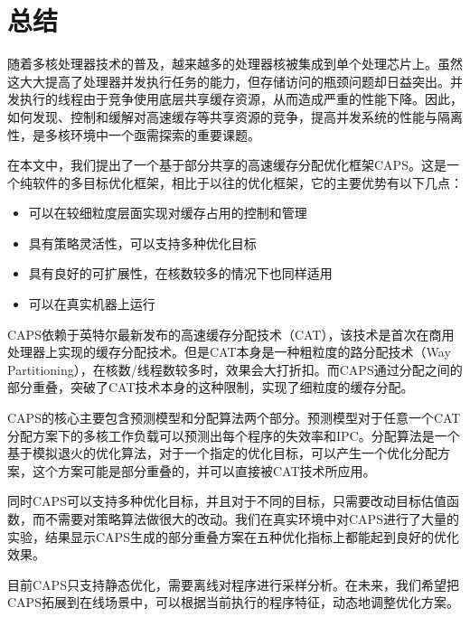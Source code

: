 
\chapter{总结} \label{chap:conclusion}

随着多核处理器技术的普及，越来越多的处理器核被集成到单个处理芯片上。虽然这大大提高了处理器并发执行任务的能力，但存储访问的瓶颈问题却日益突出。并发执行的线程由于竞争使用底层共享缓存资源，从而造成严重的性能下降。因此，如何发现、控制和缓解对高速缓存等共享资源的竞争，提高并发系统的性能与隔离性，是多核环境中一个亟需探索的重要课题。

在本文中，我们提出了一个基于部分共享的高速缓存分配优化框架CAPS。这是一个纯软件的多目标优化框架，相比于以往的优化框架，它的主要优势有以下几点：

\begin{itemize}
    \item 可以在较细粒度层面实现对缓存占用的控制和管理
    \item 具有策略灵活性，可以支持多种优化目标
    \item 具有良好的可扩展性，在核数较多的情况下也同样适用
    \item 可以在真实机器上运行
\end{itemize}

CAPS依赖于英特尔最新发布的高速缓存分配技术（CAT），该技术是首次在商用处理器上实现的缓存分配技术。但是CAT本身是一种粗粒度的路分配技术（Way Partitioning），在核数/线程数较多时，效果会大打折扣。而CAPS通过分配之间的部分重叠，突破了CAT技术本身的这种限制，实现了细粒度的缓存分配。

CAPS的核心主要包含预测模型和分配算法两个部分。预测模型对于任意一个CAT分配方案下的多核工作负载可以预测出每个程序的失效率和IPC。分配算法是一个基于模拟退火的优化算法，对于一个指定的优化目标，可以产生一个优化分配方案，这个方案可能是部分重叠的，并可以直接被CAT技术所应用。

同时CAPS可以支持多种优化目标，并且对于不同的目标，只需要改动目标估值函数，而不需要对策略算法做很大的改动。我们在真实环境中对CAPS进行了大量的实验，结果显示CAPS生成的部分重叠方案在五种优化指标上都能起到良好的优化效果。

目前CAPS只支持静态优化，需要离线对程序进行采样分析。在未来，我们希望把CAPS拓展到在线场景中，可以根据当前执行的程序特征，动态地调整优化方案。
